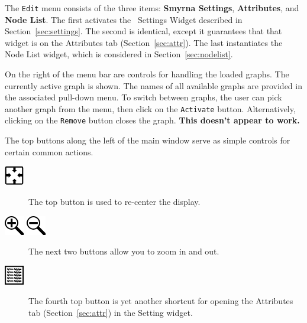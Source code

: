 The {\tt Edit} menu consists of the three items: {\bf Smyrna Settings}, {\bf Attributes},
and {\bf Node List}. The first activates the \smyrna\ Settings Widget described in
Section~\ref{sec:settings}. The second is identical, except it guarantees that that
widget is on the Attributes tab (Section~\ref{sec:attr}). 
The last instantiates the Node List widget, which is
considered in Section~\ref{sec:nodelist}.

On the right of the menu bar are controls for handling the loaded graphs.
The currently active graph is shown. The names of all available graphs are provided in the
associated pull-down menu. To switch between graphs, the user can pick another graph from
the menu, then click on the {\tt Activate} button. Alternatively, clicking on the {\tt Remove}
button closes the graph. {\bf This doesn't appear to work.}

The top buttons along the left of the main window serve as simple controls for
certain common actions. 
\begin{description}
\item[\includegraphics{figures/center.png}]
The top button is used to re-center the display. 
\item[\includegraphics{figures/zoomin.png} \includegraphics{figures/zoomout.png}]
The next two buttons allow you to zoom in and
out. 
\item[\includegraphics{figures/details.png}]
The fourth top button is yet another shortcut for opening the 
Attributes tab (Section~\ref{sec:attr}) in the Setting widget.
\end{description}

